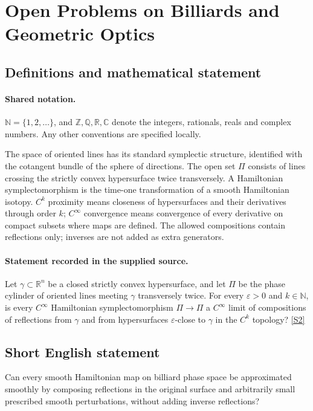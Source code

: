 \documentclass[11pt]{article}
\newcommand{\sref}[2]{\hyperlink{source:#1:#2}{[S#2]}}
\begin{document}
\section{Open Problems on Billiards and Geometric Optics}\label{statement}

\subsection{Definitions and mathematical statement}

\paragraph{Shared notation.}$\mathbb N=\{1,2,\ldots\}$, and $\mathbb Z,\mathbb Q,\mathbb R,\mathbb C$ denote the integers, rationals, reals and complex numbers. Any other conventions are specified locally.


The space of oriented lines has its standard symplectic structure, identified with the cotangent bundle of the sphere of directions. The open set $\Pi$ consists of lines crossing the strictly convex hypersurface twice transversely. A Hamiltonian symplectomorphism is the time-one transformation of a smooth Hamiltonian isotopy. $C^k$ proximity means closeness of hypersurfaces and their derivatives through order $k$; $C^\infty$ convergence means convergence of every derivative on compact subsets where maps are defined. The allowed compositions contain reflections only; inverses are not added as extra generators.
\paragraph{Statement recorded in the supplied source.}
Let $\gamma\subset\mathbb{R}^n$ be a closed strictly convex hypersurface, and let $\Pi$ be the phase cylinder of oriented lines meeting $\gamma$ transversely twice. For every $\varepsilon>0$ and $k\in\mathbb{N}$, is every $C^\infty$ Hamiltonian symplectomorphism $\Pi\to\Pi$ a $C^\infty$ limit of compositions of reflections from $\gamma$ and from hypersurfaces $\varepsilon$-close to $\gamma$ in the $C^k$ topology? \sref{statement}{2}
\subsection{Short English statement}
Can every smooth Hamiltonian map on billiard phase space be approximated smoothly by composing reflections in the original surface and arbitrarily small prescribed smooth perturbations, without adding inverse reflections?
\end{document}
